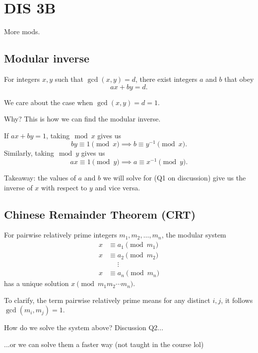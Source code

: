 \section{DIS 3B}

More mods. 

\subsection{Modular inverse}
\begin{lemma}[Bézout]
    For integers $x,y$ such that $\gcd(x,y) = d$, there exist integers $a$ and $b$ that obey \[ ax + by = d. \]
\end{lemma}

We care about the case when $\gcd(x,y) = d = 1$. 

Why? This is how we can find the modular inverse. 

\vspace{3mm}

If $ax + by = 1$, taking$\mod x$ gives us \[ by \equiv 1 \pmod{x} \implies b \equiv y^{-1} \pmod{x}. \] Similarly, taking$\mod y$ gives us \[ ax \equiv 1 \pmod{y} \implies a \equiv x^{-1} \pmod{y}. \]

Takeaway: the values of $a$ and $b$ we will solve for (Q1 on discussion) give us the inverse of $x$ with respect to $y$ and vice versa. 

\subsection{Chinese Remainder Theorem (CRT)}

\begin{theorem}[CRT]
    For pairwise relatively prime integers $m_1, m_2, \ldots, m_n$, the modular system \begin{align*}
        x &\equiv a_1 \pmod{m_1} \\
        x &\equiv a_2 \pmod{m_2} \\
        &\phantom{=}\vdots \\
        x &\equiv a_n \pmod{m_n} 
    \end{align*} has a unique solution $x \pmod{m_1m_2\cdots m_n}$. 

    To clarify, the term pairwise relatively prime means for any distinct $i,j$, it follows $\gcd(m_i, m_j) = 1$. 
\end{theorem}

How do we solve the system above? Discussion Q2...

...or we can solve them a faster way (not taught in the course lol)


